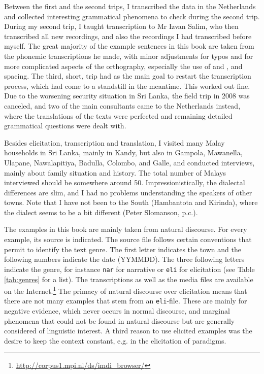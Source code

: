 Between the first and the second trips, I transcribed the data in the Netherlands and collected interesting grammatical phenomena to check during the second trip. During my second trip, I taught transcription to Mr Izvan Salim, who then transcribed all new recordings, and also the recordings I had transcribed before myself. The great majority of the example sentences in this book are taken from the phonemic transcriptions he made, with minor adjustments for typos and for more complicated aspects of the orthography, especially the use of  and , and spacing. The third, short, trip had as the main goal to restart the transcription process, which had come to a standstill in the meantime. This worked out fine. Due to the worsening security situation in Sri Lanka, the field trip in 2008 was canceled, and two of the main consultants came to the Netherlands instead, where the translations of the texts were perfected and remaining detailed grammatical questions were dealt with.

Besides elicitation, transcription and translation, I visited many Malay households in Sri Lanka, mainly in Kandy, but also in Gampola, Mawanella, Ulapane, Nawalapitiya, Badulla, Colombo, and Galle, and conducted interviews, mainly about family situation and history. The total number of Malays interviewed should be somewhere around 50. Impressionistically, the dialectal differences are slim, and I had no problems understanding the speakers of other towns. Note that I have not been to the South (Hambantota and Kirinda), where the dialect seems to be a bit different (Peter Slomanson, p.c.).

The examples in this book are mainly taken from natural discourse. For every example, its source is indicated. The source file follows certain conventions that permit to identify the text genre. The first letter indicates the town and the following numbers indicate the date (YYMMDD). The three following letters indicate the genre, for instance \texttt{nar} for narrative or \texttt{eli} for elicitation (see Table \ref{tab:genres} for a list). The transcriptions as well as the media files are available on the Internet.\footnote{\url{http://corpus1.mpi.nl/ds/imdi\_browser/}} The primacy of natural discourse over elicitation means that there are not many examples that stem from an \texttt{eli}-file. These are mainly for negative evidence, which never occurs in normal discourse, and marginal phenomena that could not be found in natural discourse but are generally considered of linguistic interest. A third reason to use elicited examples was the desire to keep the context constant, e.g. in the elicitation of paradigms.


